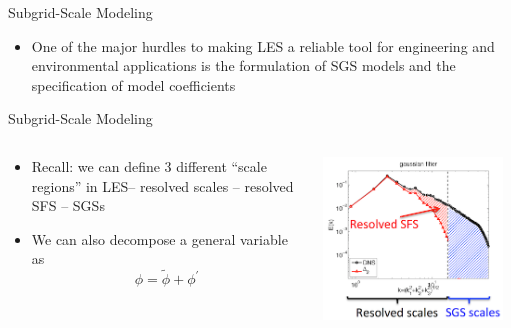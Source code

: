 \begin{frame}{Subgrid-Scale Modeling}

\begin{itemize}
\item One of the major hurdles to making LES a reliable tool for engineering and environmental applications is the formulation of SGS models and the specification of model coefficients
\end{itemize}

\end{frame}


\begin{frame}{Subgrid-Scale Modeling}

\begin{columns}[T]
    \begin{column}{.6\textwidth}
      \begin{minipage}[c][.6\textheight][c]{\linewidth}
      \begin{itemize}
      \item Recall: we can define 3 different ``scale regions'' in LES\newline -- resolved scales \newline -- resolved SFS \newline -- SGSs
      \item We can also decompose a general variable as
      $$\phi=\widetilde{\phi} + \phi^{\prime}$$
      \end{itemize}
      \end{minipage}
    \end{column}
    \begin{column}{.6\textwidth}
    \includegraphics[width=0.95\textwidth]{decomp1}
    \end{column}
  \end{columns}

\end{frame}

